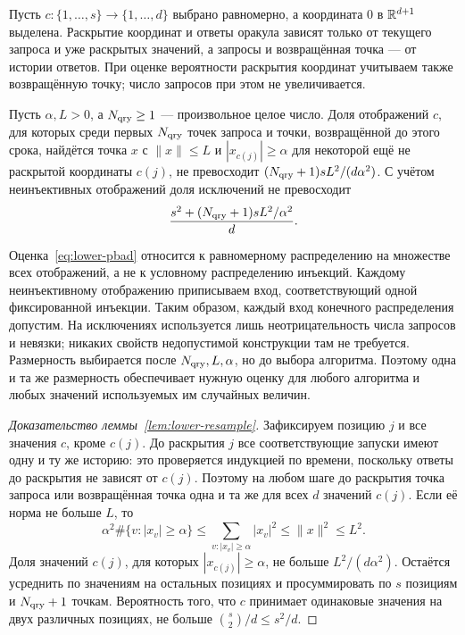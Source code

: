 Пусть $c:\{1,\ldots,s\}\to\{1,\ldots,d\}$ выбрано равномерно,
а координата $0$ в $\mathbb R^{d+1}$ выделена. Раскрытие координат и ответы оракула
зависят только от текущего запроса и уже раскрытых значений,
а запросы и возвращённая точка --- от истории ответов.
При оценке вероятности раскрытия координат учитываем также
возвращённую точку; число запросов при этом не увеличивается.

\begin{lemma}\label{lem:lower-resample}
Пусть $\alpha,L>0$, а $N_{\rm qry}\ge1$ --- произвольное целое число.
Доля отображений $c$, для которых
среди первых $N_{\rm qry}$ точек запроса и точки, возвращённой
до этого срока, найдётся точка $x$ с
$\|x\|\le L$ и $|x_{c(j)}|\ge\alpha$ для некоторой
ещё не раскрытой координаты $c(j)$, не превосходит
$(N_{\rm qry}+1)sL^2/(d\alpha^2)$. С учётом неинъективных отображений доля
исключений не превосходит
\begin{equation}\label{eq:lower-pbad}
 \frac{s^2+(N_{\rm qry}+1)sL^2/\alpha^2}{d}.
\end{equation}
\end{lemma}

Оценка~\eqref{eq:lower-pbad} относится к равномерному распределению
на множестве всех отображений, а не к условному распределению инъекций.
Каждому неинъективному отображению приписываем вход, соответствующий
одной фиксированной инъекции. Таким образом, каждый вход конечного
распределения допустим. На исключениях используется лишь неотрицательность
числа запросов и невязки; никаких свойств недопустимой конструкции там
не требуется. Размерность выбирается после $N_{\rm qry},L,\alpha$, но до выбора
алгоритма. Поэтому одна и та же размерность обеспечивает нужную оценку
для любого алгоритма и любых значений используемых им случайных величин.

\begin{proof}[Доказательство леммы~\ref{lem:lower-resample}]
Зафиксируем позицию $j$ и все значения $c$, кроме $c(j)$. До раскрытия
$j$ все соответствующие запуски имеют одну и ту же историю: это проверяется индукцией по времени,
поскольку ответы до раскрытия не зависят от $c(j)$. Поэтому на любом
шаге до раскрытия точка запроса или возвращённая точка одна и та же для всех $d$ значений
$c(j)$. Если её норма не больше $L$, то
\[
 \alpha^2\#\{v:|x_v|\ge\alpha\}
 \le\sum_{v:|x_v|\ge\alpha}|x_v|^2
 \le\|x\|^2\le L^2.
\]
Доля значений $c(j)$, для которых $|x_{c(j)}|\ge\alpha$, не больше $L^2/(d\alpha^2)$.
Остаётся усреднить по значениям на остальных позициях и просуммировать по $s$ позициям и
$N_{\rm qry}+1$ точкам. Вероятность того, что $c$ принимает одинаковые значения на двух различных позициях,
не больше $\binom{s}{2}/d\le s^2/d$.
\end{proof}

